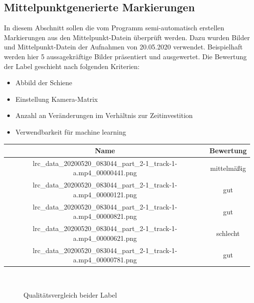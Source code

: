 \documentclass[11pt]{scrartcl}
\begin{document}
\subsection{Mittelpunktgenerierte Markierungen}
\label{sec:Mittelpunkt Generierung}

\noindent
In diesem Abschnitt sollen die vom Programm semi-automatisch erstellen Markierungen aus den Mittelpunkt-Datein überprüft werden. Dazu wurden Bilder und Mittelpunkt-Datein der Aufnahmen von 20.05.2020 verwendet. Beispielhaft werden hier 5 aussagekräftige Bilder präsentiert und ausgewertet. Die Bewertung der Label geschieht nach folgenden Kriterien:
\\

\noindent
\begin{itemize}
	\item Abbild der Schiene
	\item Einstellung Kamera-Matrix
	\item Anzahl an Veränderungen im Verhältnis zur Zeitinvestition
	\item Verwendbarkeit für machine learning
\end{itemize}

\begin{tabular}[h]{c|c}
Name & Bewertung  \\
\hline
lrc\_data\_20200520\_083044\_part\_2-1\_track-1-a.mp4\_00000441.png & mittelmäßig \\
lrc\_data\_20200520\_083044\_part\_2-1\_track-1-a.mp4\_00000121.png &  gut \\
lrc\_data\_20200520\_083044\_part\_2-1\_track-1-a.mp4\_00000821.png &  gut\\
lrc\_data\_20200520\_083044\_part\_2-1\_track-1-a.mp4\_00000621.png & schlecht  \\
lrc\_data\_20200520\_083044\_part\_2-1\_track-1-a.mp4\_00000781.png & gut  \\
\end{tabular}
\\ 

\noindent
\begin{figure}[h]
    \subfigure[00000441.png]{\texttt{[image: 441]}}
    \subfigure[00000121.png]{\texttt{[image: 121]}}
\subfigure[00000821.png]{\texttt{[image: 821]}}
\subfigure[00000621.png]{\texttt{[image: 621]}}
\subfigure[00000781]{\texttt{[image: 781]}}
\caption{Qualitätsvergleich beider Label}
\end{figure}
\\
\end{document}
